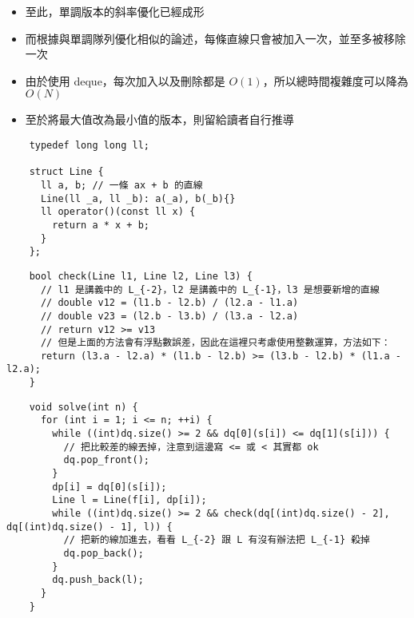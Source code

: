 \documentclass[standalone]{beamer}
\begin{document}
\begin{frame}{}
  \begin{itemize}
    \item 至此，單調版本的斜率優化已經成形
    \item 而根據與單調隊列優化相似的論述，每條直線只會被加入一次，並至多被移除一次
    \item 由於使用 deque，每次加入以及刪除都是 $O(1)$，所以總時間複雜度可以降為 $O(N)$
    \item 至於將最大值改為最小值的版本，則留給讀者自行推導
  \end{itemize}
\end{frame}

\begin{frame}[fragile]{}
  \begin{verbatim}
    typedef long long ll;

    struct Line {
      ll a, b; // 一條 ax + b 的直線
      Line(ll _a, ll _b): a(_a), b(_b){}
      ll operator()(const ll x) {
        return a * x + b;
      }
    };
  \end{verbatim}
\end{frame}

\begin{frame}[fragile]{}
  \begin{verbatim}
    bool check(Line l1, Line l2, Line l3) {
      // l1 是講義中的 L_{-2}，l2 是講義中的 L_{-1}，l3 是想要新增的直線
      // double v12 = (l1.b - l2.b) / (l2.a - l1.a) 
      // double v23 = (l2.b - l3.b) / (l3.a - l2.a)
      // return v12 >= v13
      // 但是上面的方法會有浮點數誤差，因此在這裡只考慮使用整數運算，方法如下：
      return (l3.a - l2.a) * (l1.b - l2.b) >= (l3.b - l2.b) * (l1.a - l2.a);
    }
  \end{verbatim}
\end{frame}

\begin{frame}[fragile]{}
  \begin{verbatim}
    void solve(int n) {
      for (int i = 1; i <= n; ++i) {
        while ((int)dq.size() >= 2 && dq[0](s[i]) <= dq[1](s[i])) {
          // 把比較差的線丟掉，注意到這邊寫 <= 或 < 其實都 ok
          dq.pop_front();
        }
        dp[i] = dq[0](s[i]);
        Line l = Line(f[i], dp[i]);
        while ((int)dq.size() >= 2 && check(dq[(int)dq.size() - 2], dq[(int)dq.size() - 1], l)) {
          // 把新的線加進去，看看 L_{-2} 跟 L 有沒有辦法把 L_{-1} 殺掉
          dq.pop_back();
        }
        dq.push_back(l);
      }
    }
  \end{verbatim}
\end{frame}
\end{document}
